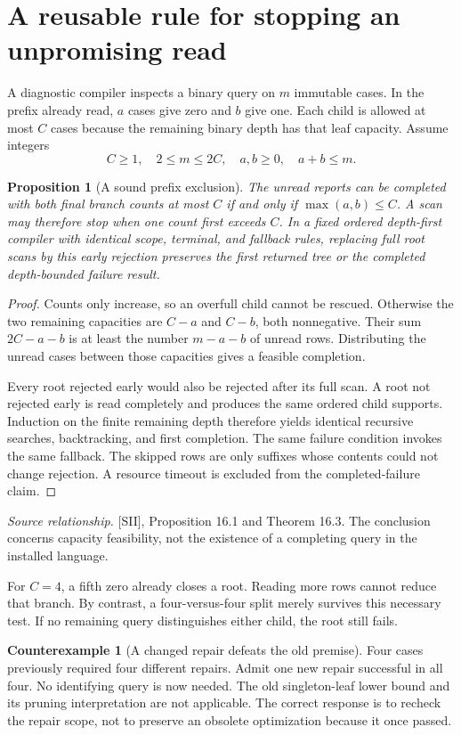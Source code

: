 \documentclass[11pt,oneside,openany]{book}
\newtheorem{proposition}[theorem]{Proposition}
\theoremstyle{definition}\newtheorem{definition}[theorem]{Definition}
\newtheorem{counterexample}[theorem]{Counterexample}
\newcommand{\source}[1]{\par{\small\textit{Source relationship.} #1}\par}
\begin{document}
\section{A reusable rule for stopping an unpromising read}
A diagnostic compiler inspects a binary query on $m$ immutable cases. In the prefix already read, $a$ cases give zero and $b$ give one. Each child is allowed at most $C$ cases because the remaining binary depth has that leaf capacity. Assume integers
\[
C\ge1,\quad 2\le m\le2C,\quad a,b\ge0,\quad a+b\le m.
\]

\begin{proposition}[A sound prefix exclusion]\label{r:prefix}
The unread reports can be completed with both final branch counts at most $C$ if and only if $\max(a,b)\le C$. A scan may therefore stop when one count first exceeds $C$. In a fixed ordered depth-first compiler with identical scope, terminal, and fallback rules, replacing full root scans by this early rejection preserves the first returned tree or the completed depth-bounded failure result.
\end{proposition}
\begin{proof}
Counts only increase, so an overfull child cannot be rescued. Otherwise the two remaining capacities are $C-a$ and $C-b$, both nonnegative. Their sum $2C-a-b$ is at least the number $m-a-b$ of unread rows. Distributing the unread cases between those capacities gives a feasible completion.

Every root rejected early would also be rejected after its full scan. A root not rejected early is read completely and produces the same ordered child supports. Induction on the finite remaining depth therefore yields identical recursive searches, backtracking, and first completion. The same failure condition invokes the same fallback. The skipped rows are only suffixes whose contents could not change rejection. A resource timeout is excluded from the completed-failure claim.
\end{proof}
\source{[SII], Proposition 16.1 and Theorem 16.3. The conclusion concerns capacity feasibility, not the existence of a completing query in the installed language.}

For $C=4$, a fifth zero already closes a root. Reading more rows cannot reduce that branch. By contrast, a four-versus-four split merely survives this necessary test. If no remaining query distinguishes either child, the root still fails.

\begin{counterexample}[A changed repair defeats the old premise]\label{ce:universal}
Four cases previously required four different repairs. Admit one new repair successful in all four. No identifying query is now needed. The old singleton-leaf lower bound and its pruning interpretation are not applicable. The correct response is to recheck the repair scope, not to preserve an obsolete optimization because it once passed.
\end{counterexample}
\end{document}
